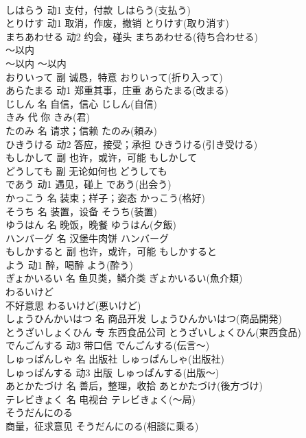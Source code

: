 \documentclass[8pt]{extreport}
\begin{document}
\begin{CJK}{UTF8}{min}
\\	しはらう	动1	支付，付款	しはらう(支払う)	
\\	とりけす	动1	取消，作废，撤销	とりけす(取り消す)	
\\	まちあわせる	动2	约会，碰头	まちあわせる(待ち合わせる)	
\\	～以内	
\\	～以内	～以内	
\\	おりいって	副	诚恳，特意	おりいって(折り入って)	
\\	あらたまる	动1	郑重其事，庄重	あらたまる(改まる)	
\\	じしん	名	自信，信心	じしん(自信)	
\\	きみ	代	你	きみ(君)	
\\	たのみ	名	请求；信赖	たのみ(頼み)	
\\	ひきうける	动2	答应，接受；承担	ひきうける(引き受ける)	
\\	もしかして	副	也许，或许，可能	もしかして	
\\	どうしても	副	无论如何也	どうしても	
\\	であう	动1	遇见，碰上	であう(出会う)	
\\	かっこう	名	装束；样子；姿态	かっこう(格好)	
\\	そうち	名	装置，设备	そうち(装置)	
\\	ゆうはん	名	晚饭，晚餐	ゆうはん(夕飯)	
\\	ハンバーグ	名	汉堡牛肉饼	ハンバーグ	
\\	もしかすると	副	也许，或许，可能	もしかすると	
\\	よう	动1	醉，喝醉	よう(酔う)	
\\	ぎょかいるい	名	鱼贝类，鳞介类	ぎょかいるい(魚介類)	
\\	わるいけど	
\\	不好意思	わるいけど(悪いけど)	
\\	しょうひんかいはつ	名	商品开发	しょうひんかいはつ(商品開発)	
\\	とうざいしょくひん	专	东西食品公司	とうざいしょくひん(東西食品)	
\\	でんごんする	动3	带口信	でんごんする(伝言～)	
\\	しゅっぱんしゃ	名	出版社	しゅっぱんしゃ(出版社)	
\\	しゅっぱんする	动3	出版	しゅっぱんする(出版～)	
\\	あとかたづけ	名	善后，整理，收拾	あとかたづけ(後方づけ)	
\\	テレビきょく	名	电视台	テレビきょく(～局)	
\\	そうだんにのる	
\\	商量，征求意见	そうだんにのる(相談に乗る)	

\end{CJK}
\end{document}
